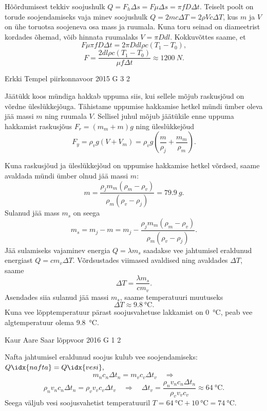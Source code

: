 \documentclass[11pt, twoside]{article}
\begin{document}
{{\ifSolution
Hõõrdumisest tekkiv soojushulk $Q = F_h \Delta s = F \mu \Delta s = \pi f D \Delta t$. Teiselt poolt on torude soojendamiseks vaja minev soojushulk $Q = 2 m c \Delta T = 2 \rho V c \Delta T$, kus $m$ ja $V$ on ühe toruotsa soojeneva osa mass ja ruumala. Kuna toru seinad on diameetrist kordades õhemad, võib hinnata ruumalaks $V = \pi D d l$. Kokkuvõttes saame, et
\[
F \mu \pi f D \Delta t = 2 \pi D d l \rho c ( T_1 - T_0 ),
\]
\[
F = \frac{2 d l \rho c ( T_1 - T_0 )}{ \mu f \Delta t } \approx \SI{1200}{N}.
\]
\fi
}

{Erkki Tempel} %
{piirkonnavoor} %
{2015} %
{G 3} %
{2} %
{

\ifSolution
Jäätükk koos mündiga hakkab uppuma siis, kui sellele mõjub raskusjõud on võrdne üleslükkejõuga. Tähistame uppumise hakkamise hetkel mündi ümber oleva jää massi $m$ ning ruumala $V$. Sellisel juhul mõjub jäätükile enne uppuma hakkamist raskusjõus $F_r=(m_m+m)g$ ning üleslükkejõud
\[ F_y=\rho_v g(V + V_m)=\rho_v g\left(\frac{m}{\rho_j} + \frac{m_m}{\rho_m}\right). \]

Kuna raskusjõud ja üleslükkejõud on uppumise hakkamise hetkel võrdsed, saame avaldada mündi ümber olnud jää massi $m$:
\[ m = \frac{\rho_j m_m(\rho_m - \rho_v)}{\rho_m(\rho_v - \rho_j)} = \SI{79,9}{g}. \]
Sulanud jää mass $m_s$ on seega
\[ m_s = m_j - m = m_j - \frac{\rho_j m_m(\rho_m - \rho_v)}{\rho_m(\rho_v - \rho_j)}. \]
Jää sulamiseks vajaminev energia $Q=\lambda m_s$ saadakse vee jahtumisel eraldunud energiast $Q=cm_v\Delta T$. Võrdsustades viimased avaldised ning avaldades $\Delta T$, saame
\[ \Delta  T = \frac{\lambda m_s}{cm_v}. \]
Asendades siia sulanud jää massi $m_s$, saame temperatuuri muutuseks
\[ \Delta T \approx \SI{9,8}{\celsius}. \]
Kuna vee lõpptemperatuur pärast soojusvahetuse lakkamist on \SI{0}{\celsius}, peab vee algtemperatuur olema \SI{9,8}{\celsius}.
\fi
}

{Kaur Aare Saar} %
{lõppvoor} %
{2016} %
{G 1} %
{2} %
{

\ifSolution
Nafta jahtumisel eraldunud soojus kulub vee soojendamiseks: $Q\idx{nafta} = Q\idx{vesi},$
\[ m_nc_n\Delta t_n = m_vc_v\Delta t_v \quad\Rightarrow \]
\[ \rho_nv_nc_n\Delta t_n = \rho_v v_vc_v\Delta t_v \quad\Rightarrow\quad \Delta t_v = \frac{\rho_nv_nc_n\Delta t_n}{\rho_vv_vc_v} \approx \SI{64}{\celsius}.  \]
Seega väljub vesi soojusvahetist temperatuuril $T = \SI{64}{\celsius} + \SI{10}{\celsius} = \SI{74}{\celsius}$.
\fi
}

}
\end{document}
